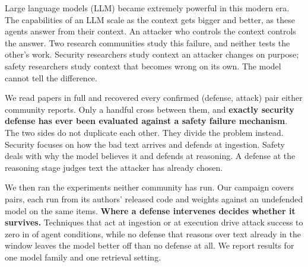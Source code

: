 Large language models (LLM) became extremely powerful in this modern era. The capabilities of an LLM scale as the context gets bigger and better, as these agents answer from their context. An attacker who controls the context
controls the answer. Two research communities study this failure, and neither tests the other's work. Security researchers study context an attacker changes on purpose; safety researchers study context that becomes wrong on its own. The model cannot tell the difference.

We read \NCorpus{} papers in full and recovered every confirmed (defense,
attack) pair either community reports. Only a handful cross between them, and
\textbf{exactly \NSecDefVsSafetyAttack{} security defense has ever been
evaluated against a safety failure mechanism}. The two sides do not duplicate
each other. 
They divide the problem instead. Security focuses on how the bad
text arrives and defends at ingestion. Safety deals with why the model believes it
and defends at reasoning. A defense at the reasoning stage judges text the
attacker has already chosen.

We then ran the experiments neither community has run. Our campaign covers
\NCampaignPairs{} pairs, each run from its authors' released code and weights
against an undefended model on the same items. \textbf{Where a
defense intervenes decides whether it survives.} Techniques that act at
ingestion or at execution drive attack success to zero in \NAgentHolds{} of
\NAgentConditions{} agent conditions, while no defense that reasons over text
already in the window leaves the model better off than no defense at all. We
report results for one model family and one retrieval setting.


